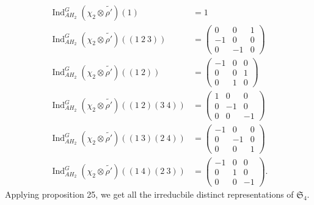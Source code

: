 \documentclass[a4paper, 12pt]{article}
\theoremstyle{Mydefinition}
\theoremstyle{Mytheorem}
\DeclareMathOperator{\Ind}{Ind}
\begin{document}
\begin{enumerate}
\begin{equation}
\begin{split}
        \Ind_{AH_2}^G \left(\chi_2\otimes \tilde{\rho'}\right) (1) &= 1\\
        \Ind_{AH_2}^G \left(\chi_2\otimes \tilde{\rho'}\right) ((1~2~3)) &= \begin{pmatrix}
        0 & 0 & 1\\
        -1 & 0 & 0\\
        0 & -1 & 0
        \end{pmatrix}\\
        \Ind_{AH_2}^G \left(\chi_2\otimes \tilde{\rho'}\right) ((1~2)) &= \begin{pmatrix}
        -1 & 0 & 0\\
        0 & 0 & 1\\
        0 & 1 & 0
        \end{pmatrix}\\
        \Ind_{AH_2}^G \left(\chi_2\otimes \tilde{\rho'}\right) ((1~2)(3~4)) &= \begin{pmatrix}
        1 & 0 & 0\\
        0 & -1 & 0\\
        0 & 0 & -1
        \end{pmatrix}\\
        \Ind_{AH_2}^G \left(\chi_2\otimes \tilde{\rho'}\right) ((1~3)(2~4)) &= \begin{pmatrix}
        -1 & 0 & 0\\
        0 & -1 & 0\\
        0 & 0 & 1
        \end{pmatrix}\\
        \Ind_{AH_2}^G \left(\chi_2\otimes \tilde{\rho'}\right) ((1~4)(2~3))&= \begin{pmatrix}
        -1 & 0 & 0\\
        0 & 1 & 0\\
        0 & 0 & -1
        \end{pmatrix}.
    \end{split}
    \end{equation}
    Applying proposition 25, we get all the irreducbile distinct representations of $\mathfrak{S}_4$.
\end{enumerate}
\end{document}
